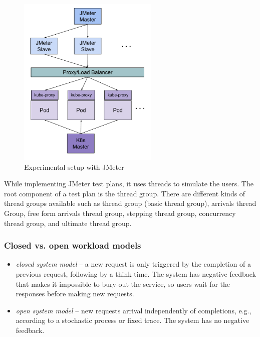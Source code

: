 \begin{figure}[htp]
    \centering
    \includegraphics[width=0.6\textwidth]{results/work_load/experimental_setup_v3.pdf}
    \caption{Experimental setup with JMeter}
    \label{fi:experimental_setup}
\end{figure}

While implementing JMeter test plans, it uses threads to simulate the users. The root component of a test plan is the thread group. There are different kinds of thread groups available such as thread group (basic thread group), arrivals thread Group, free form arrivals thread group, stepping thread group, concurrency thread group, and ultimate thread group.


\subsubsection{Closed vs. open workload models}
\label{subse:closed_vs_open_workload}

\begin{itemize}
    \item \emph{closed system model} \cite{Haggett1998AnWales} -- a new request is only triggered by the completion of a previous request, following by a think time. The system has negative feedback that makes it impossible to bury-out the service, so users wait for the responses before making new requests.
    \item \emph{open system model} -- new requests arrival independently of completions, e.g., according to a stochastic process or fixed trace. The system has no negative feedback.
\end{itemize}

